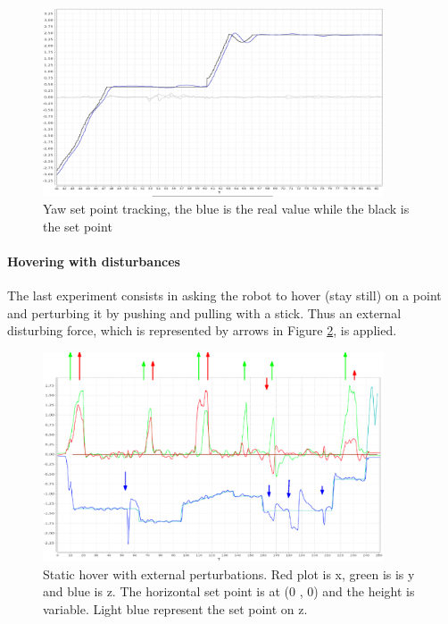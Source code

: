\begin{figure}[h]
	\centering
	\noindent
	\includegraphics[width=0.9\textwidth]{yaw_conv.png}
	\caption[Yaw tracking]{Yaw set point tracking, the blue is the real value while the black is the set point}
	\label{figure:yawconv}
\end{figure}

\noindent
\paragraph{Hovering with disturbances}
The last experiment consists in asking the robot to hover (stay still) on a point and perturbing it by pushing and pulling with a stick. Thus an external disturbing force, which is represented by arrows in Figure \ref{figure:hover}, is applied.

\begin{figure}[h]
	\centering
	\noindent
	\includegraphics[width=0.9\textwidth]{perturbation2.eps}
	\caption[Static hover with external perturbations]{Static hover with external perturbations. Red plot is x, green is is y and blue is z. The horizontal set point is at (0 , 0) and the height is variable. Light blue represent the set point on z.}
	\label{figure:hover}
\end{figure}












